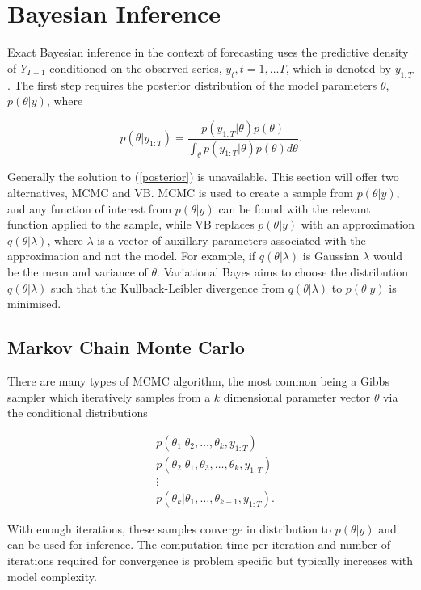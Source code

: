 \documentclass[12pt,a4paper]{article}%
\numberwithin{equation}{section}
\begin{document}
\section{Bayesian Inference}

Exact Bayesian inference in the context of forecasting uses the predictive density of $Y_{T+1}$ conditioned on the observed series, $y_{t}, t = 1, \dots T$, which is denoted by $y_{1:T}$. The first step requires the posterior distribution of the model parameters $\theta$, $p(\theta | y)$, where

\begin{equation}
\label{posterior}
 p(\theta | y_{1:T}) = \frac{p(y_{1:T}|\theta)p(\theta)}{\int_\theta p(y_{1:T}|\theta)p(\theta) d\theta}.
\end{equation}

Generally the solution to (\ref{posterior}) is unavailable. This section will offer two alternatives, MCMC and VB.
MCMC is used to create a sample from $p(\theta | y)$, and any function of interest from $p(\theta | y)$ can be found with the relevant function applied to the sample, while VB replaces $p(\theta | y)$ with an approximation $q(\theta | \lambda)$, where $\lambda$ is a vector of auxillary parameters associated with the approximation and not the model. For example, if $q(\theta | \lambda)$ is Gaussian $\lambda$ would be the mean and variance of $\theta$. Variational Bayes aims to choose the distribution $q(\theta | \lambda)$ such that the Kullback-Leibler divergence from $q(\theta | \lambda)$ to $p(\theta | y)$ is minimised.

\subsection{Markov Chain Monte Carlo}

There are many types of MCMC algorithm, the most common being a Gibbs sampler which iteratively samples from a $k$ dimensional parameter vector $\theta$ via the conditional distributions

\begin{align}
&p(\theta_1 | \theta_2, \dots, \theta_k, y_{1:T}) \nonumber \\
&p(\theta_2 | \theta_1, \theta_3, \dots, \theta_k, y_{1:T}) \nonumber \\
&\vdots \nonumber \\
&p(\theta_k | \theta_1, \dots, \theta_{k-1}, y_{1:T}). \nonumber
\end{align}

With enough iterations, these samples converge in distribution to $p(\theta | y)$ and can be used for inference. The computation time per iteration and number of iterations required for convergence is problem specific but typically increases with model complexity. 
\end{document}
